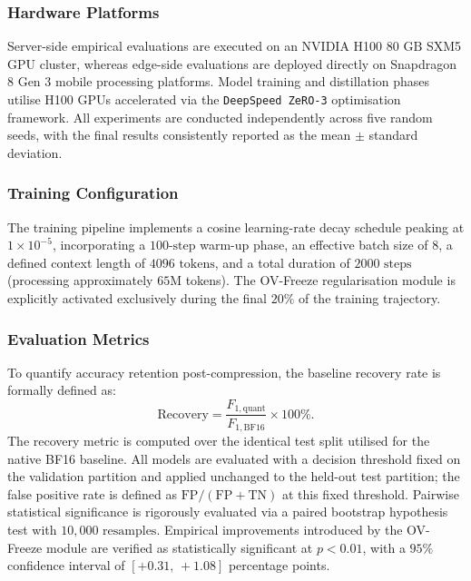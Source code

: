 \documentclass[a4paper,fleqn]{cas-sc}
\begin{document}
\subsubsection{Hardware Platforms}

Server-side empirical evaluations are executed on an NVIDIA H100 $80\text{~GB}$ SXM5 GPU cluster, whereas edge-side evaluations are deployed directly on Snapdragon 8 Gen 3 mobile processing platforms. Model training and distillation phases utilise H100 GPUs accelerated via the \texttt{DeepSpeed ZeRO-3} optimisation framework. All experiments are conducted independently across five random seeds, with the final results consistently reported as the mean $\pm$ standard deviation.

\subsubsection{Training Configuration}

The training pipeline implements a cosine learning-rate decay schedule peaking at $1\times10^{-5}$, incorporating a $100\text{-step}$ warm-up phase, an effective batch size of $8$, a defined context length of $4096\text{~tokens}$, and a total duration of $2000\text{~steps}$ (processing approximately $65\text{M}$ tokens). The OV-Freeze regularisation module is explicitly activated exclusively during the final $20\%$ of the training trajectory.

\subsubsection{Evaluation Metrics}

To quantify accuracy retention post-compression, the baseline recovery rate is formally defined as:
\begin{equation}
\label{eq:recovery}
\mathrm{Recovery} = \frac{F_{1,\mathrm{quant}}}{F_{1,\mathrm{BF16}}} \times 100\%.
\end{equation}
The recovery metric is computed over the identical test split utilised for the native BF16 baseline. All models are evaluated with a decision threshold fixed on the validation partition and applied unchanged to the held-out test partition; the false positive rate is defined as $\mathrm{FP}/(\mathrm{FP}+\mathrm{TN})$ at this fixed threshold. Pairwise statistical significance is rigorously evaluated via a paired bootstrap hypothesis test with $10{,}000\text{~resamples}$. Empirical improvements introduced by the OV-Freeze module are verified as statistically significant at $p<0.01$, with a $95\%$ confidence interval of $[+0.31,\,+1.08]$ percentage points.
\end{document}
